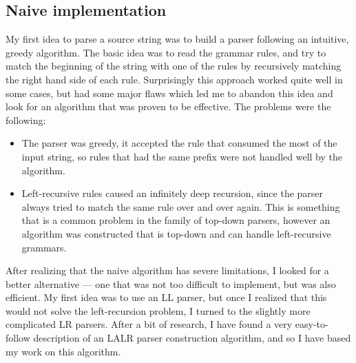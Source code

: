 \subsection{Naive implementation}
My first idea to parse a source string was to build a parser following an intuitive, greedy algorithm. The basic idea was to read the grammar rules, and try to match the beginning of the string with one of the rules by recursively matching the right hand side of each rule. Surprisingly this approach worked quite well in some cases, but had some major flaws which led me to abandon this idea and look for an algorithm that was proven to be effective. The problems were the following:
\begin{itemize}
\item The parser was greedy, it accepted the rule that consumed the most of the input string, so rules that had the same prefix were not handled well by the algorithm.
\item Left-recursive rules caused an infinitely deep recursion, since the parser always tried to match the same rule over and over again. This is something that is a common problem in the family of top-down parsers, however an algorithm was constructed \cite{frost2007modular} that is top-down and can handle left-recursive grammars.
\end{itemize}
After realizing that the naive algorithm has severe limitations, I looked for a better alternative --- one that was not too difficult to implement, but was also efficient. My first idea was to use an LL parser, but once I realized that this would not solve the left-recursion problem, I turned to the slightly more complicated LR parsers. After a bit of research, I have found a very easy-to-follow description of an LALR parser construction algorithm, and so I have based my work on this algorithm.
